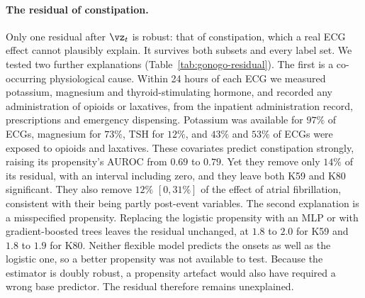 \paragraph{The residual of constipation.} Only one residual after $\vz_t$ is robust: that of constipation, which a real ECG effect cannot plausibly explain. It survives both subsets and every label set. We tested two further explanations (Table~\ref{tab:gonogo-residual}). The first is a co-occurring physiological cause. Within 24 hours of each ECG we measured potassium, magnesium and thyroid-stimulating hormone, and recorded any administration of opioids or laxatives, from the inpatient administration record, prescriptions and emergency dispensing. Potassium was available for $97\%$ of ECGs, magnesium for $73\%$, TSH for $12\%$, and $43\%$ and $53\%$ of ECGs were exposed to opioids and laxatives. These covariates predict constipation strongly, raising its propensity's AUROC from $0.69$ to $0.79$. Yet they remove only $14\%$ of its residual, with an interval including zero, and they leave both K59 and K80 significant. They also remove $12\%$ $[0, 31\%]$ of the effect of atrial fibrillation, consistent with their being partly post-event variables. The second explanation is a misspecified propensity. Replacing the logistic propensity with an MLP or with gradient-boosted trees leaves the residual unchanged, at $1.8$ to $2.0$ for K59 and $1.8$ to $1.9$ for K80. Neither flexible model predicts the onsets as well as the logistic one, so a better propensity was not available to test. Because the estimator is doubly robust, a propensity artefact would also have required a wrong base predictor. The residual therefore remains unexplained.

